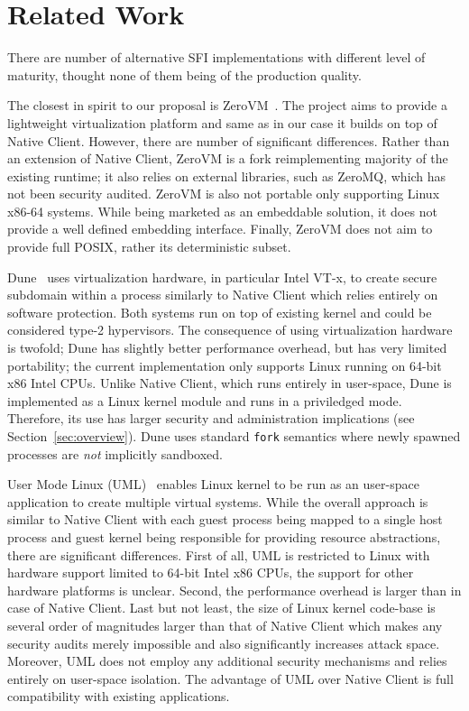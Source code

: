 \section{Related Work}
\label{sec:related}

There are number of alternative SFI implementations with different level
of maturity, thought none of them being of the production quality.

The closest in spirit to our proposal is ZeroVM~\cite{zerovm}. The
project aims to provide a lightweight virtualization platform and same
as in our case it builds on top of Native Client.  However, there are
number of significant differences. Rather than an extension of Native
Client, ZeroVM is a fork reimplementing majority of the existing
runtime; it also relies on external libraries, such as \mbox{ZeroMQ},
which has not been security audited. ZeroVM is also not portable only
supporting Linux x86-64 systems. While being marketed as an embeddable
solution, it does not provide a well defined embedding interface.
Finally, ZeroVM does not aim to provide full POSIX, rather its
deterministic subset.


Dune~\cite{belay:osdi12} uses virtualization hardware, in particular
Intel VT-x, to create secure subdomain within a process similarly to
Native Client which relies entirely on software protection. Both
systems run on top of existing kernel and could be considered type-2
hypervisors. The consequence of using virtualization hardware is
twofold; Dune has slightly better performance overhead, but has very
limited portability; the current implementation only supports Linux
running on 64-bit x86 Intel CPUs. Unlike Native Client, which runs
entirely in user-space, Dune is implemented as a Linux kernel module and
runs in a priviledged mode. Therefore, its use has larger security and
administration implications (see Section~\ref{sec:overview}). Dune uses
standard \lstinline`fork` semantics where newly spawned processes are
\emph{not} implicitly sandboxed.

User Mode Linux (UML)~\cite{uml:linux06} enables Linux kernel to be run as
an user-space application to create multiple virtual systems. While the
overall approach is similar to Native Client with each guest process being
mapped to a single host process and guest kernel being responsible for
providing resource abstractions, there are significant differences.
First of all, UML is restricted to Linux with hardware support limited
to 64-bit Intel x86 CPUs, the support for other hardware platforms is
unclear. Second, the performance overhead is larger than in case of
Native Client. Last but not least, the size of Linux kernel code-base is
several order of magnitudes larger than that of Native Client which
makes any security audits merely impossible and also significantly
increases attack space. Moreover, UML does not employ any additional
security mechanisms and relies entirely on user-space isolation. The
advantage of UML over Native Client is full compatibility with existing
applications.

\cite{heiser:hotos11}
\cite{tanenbaum:osdi08}
\cite{engler:sosp95}
\cite{yee:ieee-sp09}
\cite{sehr:usenix-sec10}
\cite{ansel:pldi11}
\cite{donovan:pnacl10}
